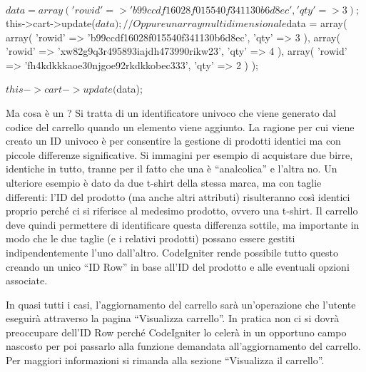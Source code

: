 \begin{code}
$data = array(
               'rowid' => 'b99ccdf16028f015540f341130b6d8ec',
               'qty'   => 3
            );

$this->cart->update($data); 

// Oppure un array multidimensionale

$data = array(
               array(
                       'rowid'   => 'b99ccdf16028f015540f341130b6d8ec',
                       'qty'     => 3
                    ),
               array(
                       'rowid'   => 'xw82g9q3r495893iajdh473990rikw23',
                       'qty'     => 4
                    ),
               array(
                       'rowid'   => 'fh4kdkkkaoe30njgoe92rkdkkobec333',
                       'qty'     => 2
                    )
            );

$this->cart->update($data);
\end{code}

Ma cosa è un ? Si tratta di un identificatore univoco che viene generato dal codice del carrello quando un elemento viene aggiunto. La ragione per cui viene creato un ID univoco è per consentire la gestione di prodotti identici ma con piccole differenze significative. Si immagini per esempio di acquistare due birre, identiche in tutto, tranne per il fatto che una è ``analcolica'' e l'altra no. Un ulteriore esempio è dato da due t-shirt della stessa marca, ma con taglie differenti: l'ID del prodotto (ma anche altri attributi) risulteranno così identici proprio perché ci si riferisce al medesimo prodotto, ovvero una t-shirt. Il carrello deve quindi permettere di identificare questa differenza sottile, ma importante in modo che le due taglie (e i relativi prodotti) possano essere gestiti indipendentemente l'uno dall'altro. CodeIgniter rende possibile tutto questo creando un unico ``ID Row'' in base all'ID del prodotto e alle eventuali opzioni associate.

In quasi tutti i casi, l'aggiornamento del carrello sarà un'operazione che l'utente eseguirà attraverso la pagina ``Visualizza carrello''. In pratica non ci si dovrà preoccupare dell'ID Row perché CodeIgniter lo celerà in un opportuno campo nascosto per poi passarlo alla funzione demandata all'aggiornamento del carrello. Per maggiori informazioni si rimanda alla sezione ``Visualizza il carrello''. 


